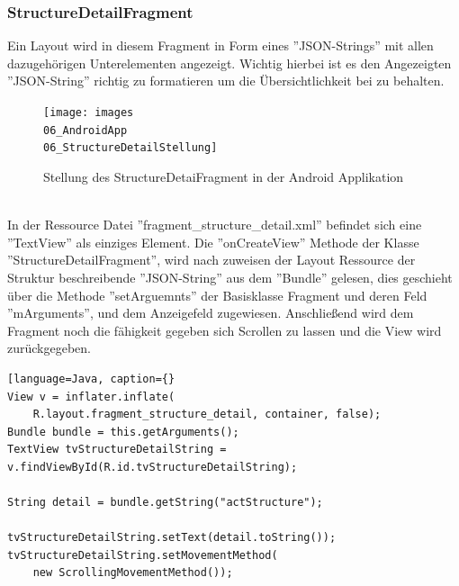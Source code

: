 \subsubsection{StructureDetailFragment}
Ein Layout wird in diesem Fragment in Form eines ''JSON-Strings'' mit allen dazugehörigen Unterelementen angezeigt. Wichtig hierbei ist es den Angezeigten ''JSON-String'' richtig zu formatieren um die Übersichtlichkeit bei zu behalten.
\\
\begin{figure}[H]
\centering
\texttt{[image: images\\06\_AndroidApp\\06\_StructureDetailStellung]}
\caption{Stellung des StructureDetaiFragment in der Android Applikation}
\label{fig:mediaNav}
\end{figure}
\\
In der Ressource Datei ''fragment\_structure\_detail.xml'' befindet sich eine ''TextView'' als einziges Element. Die ''onCreateView'' Methode der Klasse ''StructureDetailFragment'', wird nach zuweisen der Layout Ressource der Struktur beschreibende ''JSON-String'' aus dem ''Bundle'' gelesen, dies geschieht über die Methode ''setArguemnts'' der Basisklasse Fragment und deren Feld ''mArguments'', und dem Anzeigefeld zugewiesen. Anschließend wird dem Fragment noch die fähigkeit gegeben sich Scrollen zu lassen und die View wird zurückgegeben. 
\begin{lstlisting}[language=Java, caption={}
View v = inflater.inflate(
	R.layout.fragment_structure_detail, container, false);
Bundle bundle = this.getArguments();
TextView tvStructureDetailString = 													v.findViewById(R.id.tvStructureDetailString);
    
String detail = bundle.getString("actStructure");
    
tvStructureDetailString.setText(detail.toString());    tvStructureDetailString.setMovementMethod(
    new ScrollingMovementMethod());
\end{lstlisting}
